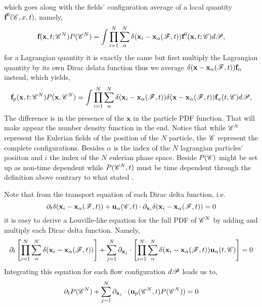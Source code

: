 which goes along with the fields' configuration average of a local quantity $\textbf{f}^0(\mathscr{C},x,t)$, namely, 
\begin{equation*}
    \textbf{f}(\textbf{x},t;\mathscr{C}^N) P(\mathscr{C}^N)
    = \int 
    \prod_{i=1}^{N}\sum_{\alpha}^{N}\delta(\textbf{x}_i - \textbf{x}_\alpha(\mathscr{F},t)) \textbf{f}^0(\textbf{x},t;\mathscr{C})
    d\mathscr{P},
\end{equation*}
for a Lagrangian quantity it is exactly the same but first multiply the Lagrangian quantity by its own Dirac delata function thus we average $\delta(\textbf{x}-\textbf{x}_\alpha(\mathscr{F},t)) \textbf{f}_\alpha$ instead, which yields, 
\begin{equation*}
    \textbf{f}_p(\textbf{x},t;\mathscr{C}^N) P(\textbf{x},\mathscr{C}^N)
    = \int 
    \prod_{i=1}^{N}\sum_{\alpha}^{N}\delta(\textbf{x}_i - \textbf{x}_\alpha(\mathscr{F},t)) 
    \delta(\textbf{x} - \textbf{x}_\alpha(\mathscr{F},t)) 
    \textbf{f}_\alpha(t,\mathscr{C})
    d\mathscr{P},
\end{equation*}
The difference is in the presence of the $\textbf{x}$ in the particle PDF function. 
That will make appear the number density function in the end. 
Notice that while $\mathscr{C}^N$ represent the Eulerian fields of the position of the $N$ particle, the $\mathscr{C}$ represent the complete configurations.
Besides $\alpha$ is the index of the $N$ lagrangian particles' posiiton and $i$ the index of the $N$ eulerian phase space.
Beside $P(\mathscr{C})$  might be set up as non-time dependent while $P(\mathscr{C}^N,t)$ must be time dependent through the definition above contrary to what stated \citet{zhang1994ensemble}. 

Note that from the transport equation of each Dirac delta function, i.e. 
\begin{equation*}
    \partial_t \delta(\textbf{x}_i - \textbf{x}_\alpha(\mathscr{F},t))
    + \textbf{u}_\alpha(\mathscr{C},t)\cdot\partial_{\textbf{x}_i}\delta(\textbf{x}_i-\textbf{x}_\alpha(\mathscr{F},t))
    =0 
\end{equation*}
it is easy to derive a Louville-like equation for the full PDF of $\mathscr{C}^N$ by adding and multiply each Dirac delta function. 
Namely, 
\begin{equation*}
    \partial_t \left[
        \prod_{i=1}^{N}\sum_{\alpha}^{N}\delta(\textbf{x}_i - \textbf{x}_\alpha(\mathscr{F},t)) 
    \right]
    + 
    \sum_{j=1}^N \partial_{\textbf{x}_j}\cdot\left[
        \prod_{i=1}^{N}\sum_{\alpha}^{N}\delta(\textbf{x}_i - \textbf{x}_\alpha(\mathscr{F},t)) \textbf{u}_\alpha(t,\mathscr{C}) 
    \right]
    =0 
\end{equation*}
Integrating this equation for each flow configuration $d\mathscr{P}$ leads us to, 
\begin{equation*}
    \partial_t P(\mathscr{C}^N)
    + 
    \sum_{j=1}^N \partial_{\textbf{x}_j} \cdot
    (\textbf{u}_p(\mathscr{C}^N,t) P(\mathscr{C}^N) )
    =0 
\end{equation*}


